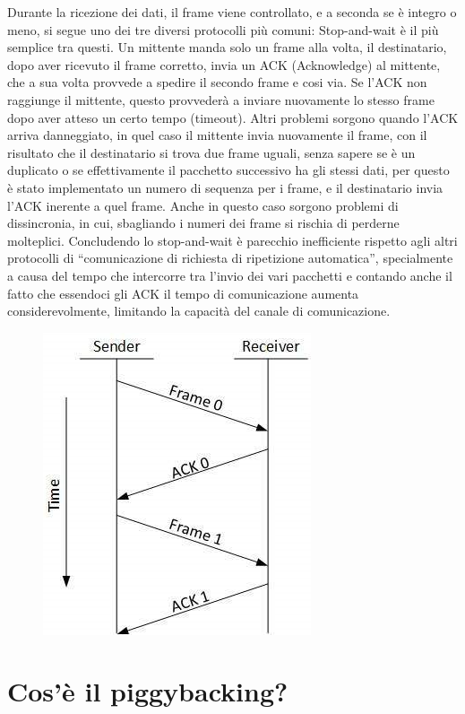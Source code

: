 Durante la ricezione dei dati, il frame viene controllato, e a seconda se è integro o meno, si segue uno dei tre diversi protocolli più comuni: 
Stop-and-wait è il più semplice tra questi.
Un mittente manda solo un frame alla volta, il destinatario, dopo aver ricevuto il frame corretto, invia un ACK (Acknowledge) al mittente, che a sua volta provvede a spedire il secondo frame e cosi via. 
Se l'ACK non raggiunge il mittente, questo provvederà a inviare nuovamente lo stesso frame dopo aver atteso un certo tempo (timeout).
Altri problemi sorgono quando l'ACK arriva danneggiato, in quel caso il mittente invia nuovamente il frame, con il risultato che il destinatario si trova due frame uguali, senza sapere se è un duplicato o se effettivamente il pacchetto successivo ha gli stessi dati, per questo è stato implementato un numero di sequenza per i frame, e il destinatario invia l'ACK inerente a quel frame.
Anche in questo caso sorgono problemi di dissincronia, in cui, sbagliando i numeri dei frame si rischia di perderne molteplici.
Concludendo lo stop-and-wait è parecchio inefficiente rispetto agli altri protocolli di “comunicazione di richiesta di ripetizione automatica”, specialmente a causa del tempo che intercorre tra l'invio dei vari pacchetti e contando anche il fatto che essendoci gli ACK il tempo di comunicazione aumenta considerevolmente, limitando la capacità del canale di comunicazione.
 
\begin{figure}[H]
\centering
\includegraphics[scale=0.65]{res/img/17_StopAndWait.png}
\end{figure}
	     
\section{Cos'è il piggybacking?}

